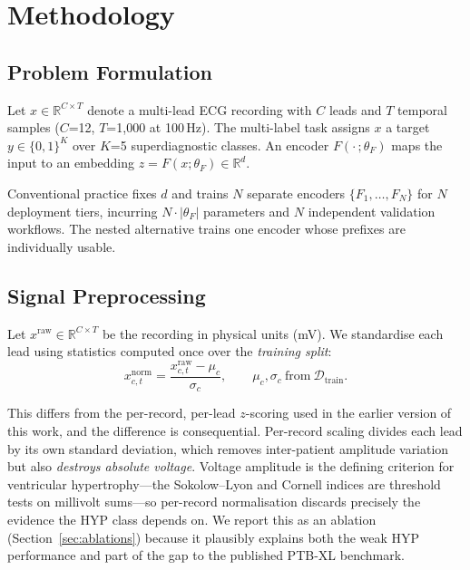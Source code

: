 \section{Methodology}

\subsection{Problem Formulation}

Let $x \in \mathbb{R}^{C \times T}$ denote a multi-lead ECG recording with
$C$ leads and $T$ temporal samples ($C$=12, $T$=1{,}000 at 100\,Hz). The
multi-label task assigns $x$ a target $y \in \{0,1\}^K$ over $K$=5
superdiagnostic classes. An encoder $F(\cdot\,;\theta_F)$ maps the input to an
embedding $z = F(x;\theta_F) \in \mathbb{R}^d$.

Conventional practice fixes $d$ and trains $N$ separate encoders
$\{F_1,\dots,F_N\}$ for $N$ deployment tiers, incurring $N\cdot|\theta_F|$
parameters and $N$ independent validation workflows. The nested alternative
trains one encoder whose prefixes are individually usable.

\subsection{Signal Preprocessing}
\label{sec:preproc}

Let $x^{\mathrm{raw}} \in \mathbb{R}^{C\times T}$ be the recording in physical
units (mV). We standardise each lead using statistics computed once over the
\emph{training split}:
\begin{equation}
x^{\mathrm{norm}}_{c,t} = \frac{x^{\mathrm{raw}}_{c,t} - \mu_c}{\sigma_c},
\qquad
\mu_c, \sigma_c \ \text{from} \ \mathcal{D}_{\mathrm{train}}.
\label{eq:norm}
\end{equation}

This differs from the per-record, per-lead $z$-scoring used in the earlier
version of this work, and the difference is consequential. Per-record scaling
divides each lead by its own standard deviation, which removes inter-patient
amplitude variation but also \emph{destroys absolute voltage}. Voltage
amplitude is the defining criterion for ventricular hypertrophy---the
Sokolow--Lyon and Cornell indices are threshold tests on millivolt
sums---so per-record normalisation discards precisely the evidence the HYP
class depends on. We report this as an ablation
(Section~\ref{sec:ablations}) because it plausibly explains both the weak HYP
performance and part of the gap to the published PTB-XL benchmark.


